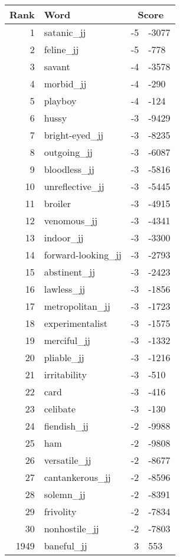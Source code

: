 \begin{longtable}[!htbp]{| rlr@{.}l |}
    \hline
    \textbf{Rank} & \textbf{Word} & \multicolumn{2}{c|}{\textbf{Score}} \\
    \hline
    \endhead
    1 & satanic\_jj & -5 & -3077 \\
    2 & feline\_jj & -5 & -778 \\
    3 & savant & -4 & -3578 \\
    4 & morbid\_jj & -4 & -290 \\
    5 & playboy & -4 & -124 \\
    6 & hussy & -3 & -9429 \\
    7 & bright-eyed\_jj & -3 & -8235 \\
    8 & outgoing\_jj & -3 & -6087 \\
    9 & bloodless\_jj & -3 & -5816 \\
    10 & unreflective\_jj & -3 & -5445 \\
    11 & broiler & -3 & -4915 \\
    12 & venomous\_jj & -3 & -4341 \\
    13 & indoor\_jj & -3 & -3300 \\
    14 & forward-looking\_jj & -3 & -2793 \\
    15 & abstinent\_jj & -3 & -2423 \\
    16 & lawless\_jj & -3 & -1856 \\
    17 & metropolitan\_jj & -3 & -1723 \\
    18 & experimentalist & -3 & -1575 \\
    19 & merciful\_jj & -3 & -1332 \\
    20 & pliable\_jj & -3 & -1216 \\
    21 & irritability & -3 & -510 \\
    22 & card & -3 & -416 \\
    23 & celibate & -3 & -130 \\
    24 & fiendish\_jj & -2 & -9988 \\
    25 & ham & -2 & -9808 \\
    26 & versatile\_jj & -2 & -8677 \\
    27 & cantankerous\_jj & -2 & -8596 \\
    28 & solemn\_jj & -2 & -8391 \\
    29 & frivolity & -2 & -7834 \\
    30 & nonhostile\_jj & -2 & -7803 \\
    1949 & baneful\_jj & 3 & 553 \\

\end{longtable}
